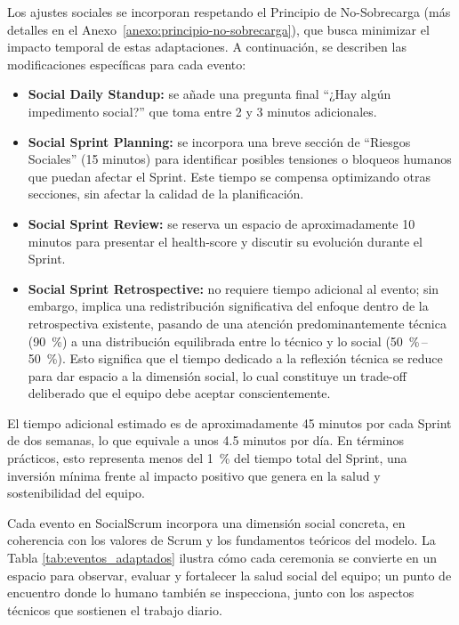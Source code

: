 Los ajustes sociales se incorporan respetando el Principio de No-Sobrecarga (más detalles en el Anexo~\ref{anexo:principio-no-sobrecarga}), que busca minimizar el impacto temporal de estas adaptaciones. A continuación, se describen las modificaciones específicas para cada evento:

\begin{itemize}
    \item \textbf{Social Daily Standup:} se añade una pregunta final ``¿Hay algún impedimento social?'' que toma entre 2 y 3 minutos adicionales.
    \item \textbf{Social Sprint Planning:} se incorpora una breve sección de ``Riesgos Sociales'' (15 minutos) para identificar posibles tensiones o bloqueos humanos que puedan afectar el Sprint. Este tiempo se compensa optimizando otras secciones, sin afectar la calidad de la planificación.
    \item \textbf{Social Sprint Review:} se reserva un espacio de aproximadamente 10 minutos para presentar el \gls{health-score} y discutir su evolución durante el Sprint.
    \item \textbf{Social Sprint Retrospective:} no requiere tiempo adicional al evento; sin embargo, implica una redistribución significativa del enfoque dentro de la retrospectiva existente, pasando de una atención predominantemente técnica (90~\%) a una distribución equilibrada entre lo técnico y lo social (50~\%\,--\,50~\%). Esto significa que el tiempo dedicado a la reflexión técnica se reduce para dar espacio a la dimensión social, lo cual constituye un trade-off deliberado que el equipo debe aceptar conscientemente.
\end{itemize}

El tiempo adicional estimado es de aproximadamente 45 minutos por cada Sprint de dos semanas, lo que equivale a unos 4.5 minutos por día.
En términos prácticos, esto representa menos del 1~\% del tiempo total del Sprint, una inversión mínima frente al impacto positivo que genera en la salud y sostenibilidad del equipo.

Cada evento en SocialScrum incorpora una dimensión social concreta, en coherencia con los valores de Scrum y los fundamentos teóricos del modelo.
La Tabla \ref{tab:eventos_adaptados} ilustra cómo cada ceremonia se convierte en un espacio para observar, evaluar y fortalecer la salud social del equipo; un punto de encuentro donde lo humano también se inspecciona, junto con los aspectos técnicos que sostienen el trabajo diario.

